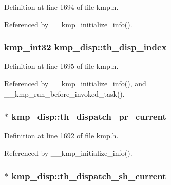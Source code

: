 Definition at line 1694 of file kmp.\-h.



Referenced by \-\_\-\-\_\-kmp\-\_\-initialize\-\_\-info().

\hypertarget{structkmp__disp_a160f4b28144ce1cb64ccf0ceb9ad9ffc}{
\subsubsection[{th\-\_\-disp\-\_\-index}]{\setlength{\rightskip}{0pt plus 5cm}kmp\-\_\-int32 kmp\-\_\-disp\-::th\-\_\-disp\-\_\-index}}\label{structkmp__disp_a160f4b28144ce1cb64ccf0ceb9ad9ffc}


Definition at line 1695 of file kmp.\-h.



Referenced by \-\_\-\-\_\-kmp\-\_\-initialize\-\_\-info(), and \-\_\-\-\_\-kmp\-\_\-run\-\_\-before\-\_\-invoked\-\_\-task().

\hypertarget{structkmp__disp_a720af84b753cfa5961f42459754972b2}{
\subsubsection[{th\-\_\-dispatch\-\_\-pr\-\_\-current}]{$\ast$ kmp\-\_\-disp\-::th\-\_\-dispatch\-\_\-pr\-\_\-current}}\label{structkmp__disp_a720af84b753cfa5961f42459754972b2}


Definition at line 1692 of file kmp.\-h.



Referenced by \-\_\-\-\_\-kmp\-\_\-initialize\-\_\-info().

\hypertarget{structkmp__disp_afe430cfc39a695761004b645704b6b63}{
\subsubsection[{th\-\_\-dispatch\-\_\-sh\-\_\-current}]{$\ast$ kmp\-\_\-disp\-::th\-\_\-dispatch\-\_\-sh\-\_\-current}}\label{structkmp__disp_afe430cfc39a695761004b645704b6b63}


